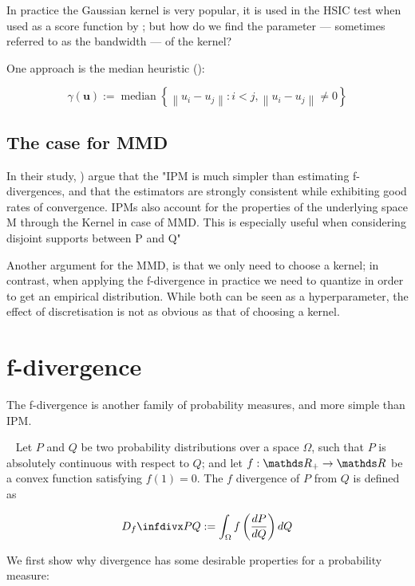 In practice the Gaussian kernel is very popular, it is used in the HSIC test when used as a
score function by \cite{Mooij2016jmlr}; but how do we find the parameter --- sometimes referred to 
as the bandwidth --- of the kernel?

One approach is the median heuristic (\cite{scholkopf2002learning}):

$$
\hat{\gamma}(\mathbf{u}):=\operatorname{median}\left\{\left\|u_{i}-u_{j}\right\|:  i<j ,\left\|u_{i}-u_{j}\right\| \neq 0\right\}
$$

\subsection{The case for MMD}

In their study, \cite{sriperumbudur2009integral}) argue that the "IPM is much
simpler than estimating f-divergences, and that the estimators
are strongly consistent while exhibiting good rates of convergence. IPMs also account for the properties of
the underlying space M through the Kernel in case of MMD. This is especially
useful when considering disjoint supports between P and Q"

Another argument for the MMD, is that we only need to choose a kernel; in contrast, 
when applying the f-divergence in practice we need to quantize in order to get an 
empirical distribution. While both can be seen as a hyperparameter, the effect of 
discretisation is not as obvious as that of choosing a kernel. 

\section{f-divergence}

The f-divergence is another family of probability measures, and more simple than IPM.

\begin{definition}[f-divergence]
    ~
Let $P$ and $Q$ be two probability distributions over a space $\Omega$, 
such that $P$ is absolutely continuous with respect to $Q$; and let 
$f: \R_+ \rightarrow \R$ be a convex function satisfying $f(1) = 0$. The $f$ divergence of 
$P$ from $Q$ is defined as

$$
    \infdiv{P}{Q} := \int_\Omega f \left( \frac{dP}{dQ} \right) dQ
$$
    
\end{definition}


We first show why divergence has some desirable properties for a probability measure:


